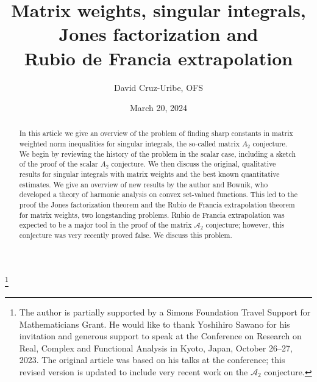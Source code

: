 \documentclass[12pt]{amsart}
\theoremstyle{definition}
\theoremstyle{remark}
\numberwithin{equation}{section}
\newcommand{\A}{\mathcal A}
\begin{document}
\title[Factorization and Extrapolation]
{Matrix weights, singular integrals, \\Jones factorization and \\
    Rubio de Francia extrapolation}


\author{David Cruz-Uribe, OFS}
\address{Dept. of Mathematics \\
University of Alabama \\
 Tuscaloosa, AL 35487, USA}





\date{March 20, 2024}

\thanks{The author is partially supported by a Simons Foundation
  Travel Support for Mathematicians  Grant.  He would like to thank
  Yoshihiro Sawano for his invitation and generous support to speak at
  the Conference on Research on Real, Complex and Functional Analysis
  in Kyoto, Japan, October 26--27, 2023.  The original article was
  based on his talks at the conference; this revised version is
  updated to include very recent work on the $\A_2$ conjecture.}

\begin{abstract}
  In this article we give an overview of the problem of finding sharp
  constants in matrix weighted norm inequalities for singular
  integrals, the so-called matrix $A_2$ conjecture.  We begin by
  reviewing the history of the problem in the scalar case, including a
  sketch of the proof of the scalar $A_2$ conjecture.  We then discuss
  the original, qualitative results for singular integrals with matrix
  weights and the best known quantitative estimates.  We give an
  overview of new results by the author and Bownik, who developed a
  theory of harmonic analysis on convex set-valued functions.  This
  led to the proof the Jones factorization theorem and the Rubio de
  Francia extrapolation theorem for matrix weights, two longstanding
  problems.  Rubio de Francia extrapolation was expected to be a major
  tool in the proof of the matrix $\A_2$ conjecture; however, this conjecture was very
  recently proved false.  We discuss this problem.
\end{abstract}

\maketitle
\end{document}
